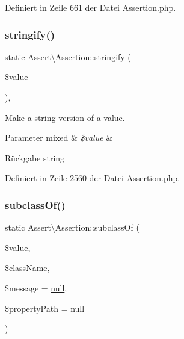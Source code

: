 Definiert in Zeile 661 der Datei Assertion.\+php.

\mbox{\label{class_assert_1_1_assertion_a811c7cf9ee426f14592c15b459c6090c}} 
\subsubsection{\texorpdfstring{stringify()}{stringify()}}
{\footnotesize\ttfamily static Assert\textbackslash{}\+Assertion\+::stringify (\begin{DoxyParamCaption}\item[{}]{\$value }\end{DoxyParamCaption})\hspace{0.3cm}{\ttfamily [static]}, {\ttfamily [protected]}}

Make a string version of a value.


\begin{DoxyParams}[1]{Parameter}
mixed & {\em \$value} & \\
\hline
\end{DoxyParams}
\begin{DoxyReturn}{Rückgabe}
string 
\end{DoxyReturn}


Definiert in Zeile 2560 der Datei Assertion.\+php.

\mbox{\label{class_assert_1_1_assertion_af2c7cee866ef4853ecd1a7d0d8a212f8}} 
\subsubsection{\texorpdfstring{subclass\+Of()}{subclassOf()}}
{\footnotesize\ttfamily static Assert\textbackslash{}\+Assertion\+::subclass\+Of (\begin{DoxyParamCaption}\item[{}]{\$value,  }\item[{}]{\$class\+Name,  }\item[{}]{\$message = {\ttfamily \mbox{\hyperlink{class_assert_1_1_assertion_af95d8b1582dd619cc0159041bc6892c5}{null}}},  }\item[{}]{\$property\+Path = {\ttfamily \mbox{\hyperlink{class_assert_1_1_assertion_af95d8b1582dd619cc0159041bc6892c5}{null}}} }\end{DoxyParamCaption})\hspace{0.3cm}{\ttfamily [static]}}

